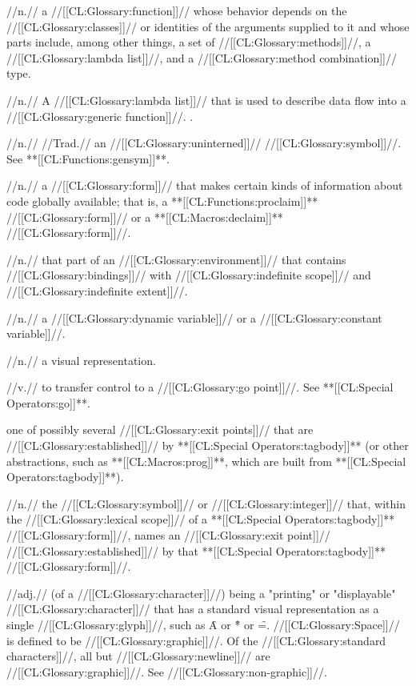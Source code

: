  //n.// a //[[CL:Glossary:function]]// whose behavior depends on the //[[CL:Glossary:classes]]// or identities of the arguments supplied to it and whose parts include, among other things, a set of //[[CL:Glossary:methods]]//, a //[[CL:Glossary:lambda list]]//, and a //[[CL:Glossary:method combination]]// type.

 //n.// A //[[CL:Glossary:lambda list]]// that is used to describe data flow into a //[[CL:Glossary:generic function]]//. \Seesection\GFLambdaLists.

 //n.// //Trad.// an //[[CL:Glossary:uninterned]]// //[[CL:Glossary:symbol]]//. See **[[CL:Functions:gensym]]**.

 //n.// a //[[CL:Glossary:form]]// that makes certain kinds of information about code globally available; that is, a **[[CL:Functions:proclaim]]** //[[CL:Glossary:form]]// or a **[[CL:Macros:declaim]]** //[[CL:Glossary:form]]//.

 //n.// that part of an //[[CL:Glossary:environment]]// that contains //[[CL:Glossary:bindings]]// with //[[CL:Glossary:indefinite scope]]// and //[[CL:Glossary:indefinite extent]]//.
 
 //n.// a //[[CL:Glossary:dynamic variable]]// or a //[[CL:Glossary:constant variable]]//.%

 //n.// a visual representation. 

 //v.// to transfer control to a //[[CL:Glossary:go point]]//. See **[[CL:Special Operators:go]]**.

 one of possibly several //[[CL:Glossary:exit points]]// that are //[[CL:Glossary:established]]// by **[[CL:Special Operators:tagbody]]** (or other abstractions, such as **[[CL:Macros:prog]]**, which are built from **[[CL:Special Operators:tagbody]]**).

 //n.// the //[[CL:Glossary:symbol]]// or //[[CL:Glossary:integer]]// that, within the //[[CL:Glossary:lexical scope]]// of a **[[CL:Special Operators:tagbody]]** //[[CL:Glossary:form]]//, names an //[[CL:Glossary:exit point]]// //[[CL:Glossary:established]]// by that **[[CL:Special Operators:tagbody]]** //[[CL:Glossary:form]]//.

 //adj.// (of a //[[CL:Glossary:character]]//) being a "printing" or "displayable" //[[CL:Glossary:character]]// that has a standard visual representation as a single //[[CL:Glossary:glyph]]//, such as \f{A} or \f{*} or \f{=}. //[[CL:Glossary:Space]]// is defined to be //[[CL:Glossary:graphic]]//. Of the //[[CL:Glossary:standard characters]]//, all but //[[CL:Glossary:newline]]// are //[[CL:Glossary:graphic]]//. See //[[CL:Glossary:non-graphic]]//.

